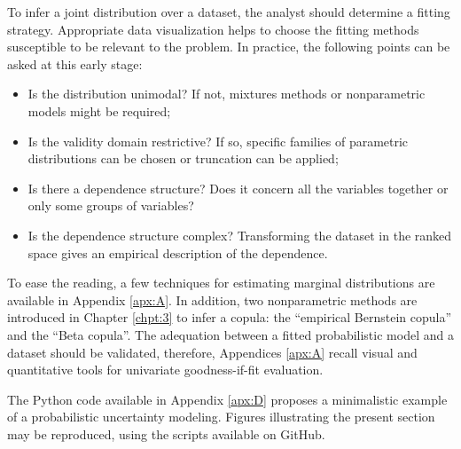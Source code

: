 To infer a joint distribution over a dataset, the analyst should determine a fitting strategy. 
Appropriate data visualization helps to choose the fitting methods susceptible to be relevant to the problem. 
In practice, the following points can be asked at this early stage:
\begin{itemize}
    \item Is the distribution unimodal? If not, mixtures methods or nonparametric models might be required;
    \item Is the validity domain restrictive? If so, specific families of parametric distributions can be chosen or truncation can be applied;
    \item Is there a dependence structure? Does it concern all the variables together or only some groups of variables? 
    \item Is the dependence structure complex? Transforming the dataset in the ranked space gives an empirical description of the dependence. 
\end{itemize} 

To ease the reading, a few techniques for estimating marginal distributions are available in Appendix \ref{apx:A}. 
In addition, two nonparametric methods are introduced in Chapter \ref{chpt:3} to infer a copula: the ``empirical Bernstein copula'' and the ``Beta copula''. 
The adequation between a fitted probabilistic model and a dataset should be validated, therefore, Appendices \ref{apx:A} recall visual and quantitative tools for univariate goodness-if-fit evaluation.


\begin{otexample}
    The Python code available in Appendix \ref{apx:D} proposes a minimalistic \ot example of a probabilistic uncertainty modeling. 
    Figures illustrating the present section may be reproduced, using the \ot scripts available on GitHub\footnotemark. 
\end{otexample}


